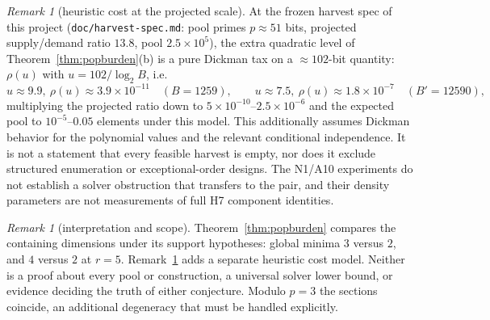 \documentclass[11pt]{article}
\theoremstyle{remark}
\newtheorem{remark}[theorem]{Remark}
\begin{document}
\begin{remark}[heuristic cost at the projected scale]\label{prop:popcost}
At the frozen harvest spec of this project (\texttt{doc/harvest-spec.md}:
pool primes $p \approx 51$ bits, projected supply/demand ratio $13.8$, pool
$2.5\times 10^5$), the extra quadratic level of
Theorem~\ref{thm:popburden}(b) is a pure Dickman tax on a
$\approx 102$-bit quantity: $\rho(u)$ with $u = 102/\log_2 B$, i.e.
\[
u \approx 9.9,\ \rho(u) \approx 3.9\times10^{-11} \quad (B = 1259),
\qquad
u \approx 7.5,\ \rho(u) \approx 1.8\times10^{-7} \quad (B' = 12590),
\]
multiplying the projected ratio down to $5\times10^{-10}$--$2.5\times10^{-6}$
and the expected pool to $10^{-5}$--$0.05$ elements under this model.
This additionally assumes Dickman behavior for the polynomial values and
the relevant conditional independence. It is not a statement that every
feasible harvest is empty, nor does it exclude structured enumeration or
exceptional-order designs. The N1/A10 experiments do not establish a
solver obstruction that transfers to the pair, and their density parameters
are not measurements of full H7 component identities.
\end{remark}

\begin{remark}[interpretation and scope]\label{rem:popscope}
Theorem~\ref{thm:popburden} compares the containing dimensions under its
support hypotheses: global minima $3$ versus $2$, and $4$ versus $2$ at
$r=5$. Remark~\ref{prop:popcost} adds a separate heuristic cost model.
Neither is a proof about every pool or construction, a universal solver
lower bound, or evidence deciding the truth of either conjecture. Modulo
$p=3$ the sections coincide, an additional degeneracy that must be
handled explicitly.
\end{remark}
\end{document}
